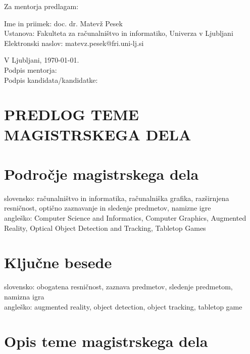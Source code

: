 \documentclass[a4paper, 12pt]{article}
\begin{document}
Za mentorja predlagam:

\hfill\begin{minipage}{\dimexpr\textwidth-2cm}
Ime in priimek: doc. dr. Matevž Pesek\\
Ustanova: Fakulteta za računalništvo in informatiko, Univerza v Ljubljani\\
Elektronski naslov: matevz.pesek@fri.uni-lj.si
\end{minipage}

\bigskip


\hfill V Ljubljani, \today. \\
%
\hfill Podpis mentorja: \hspace{180px} \\ Podpis kandidata/kandidatke:    

\clearpage
\section*{PREDLOG TEME MAGISTRSKEGA DELA}

\section{Področje magistrskega dela}

slovensko: računalništvo in informatika, računalniška grafika, razširnjena resničnost, optično zaznavanje in sledenje predmetov, namizne igre\\
angleško: Computer Science and Informatics, Computer Graphics, Augmented Reality, Optical Object Detection and Tracking, Tabletop Games

\section{Ključne besede}

slovensko: obogatena resničnost, zaznava predmetov, sledenje predmetom, namizna igra \\
angleško: augmented reality, object detection, object tracking, tabletop game

\section{Opis teme magistrskega dela}
\end{document}
